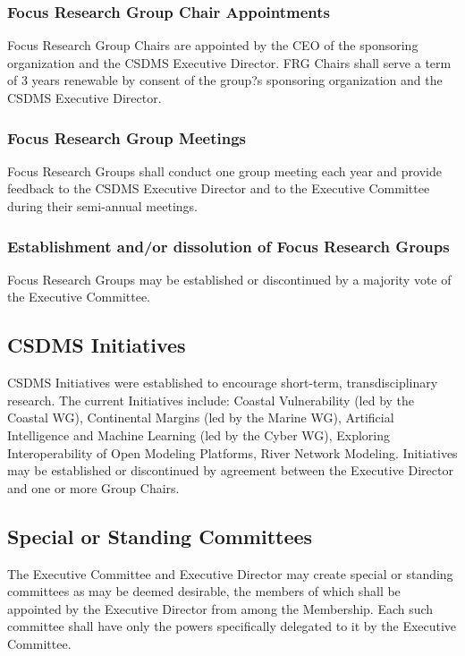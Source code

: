 \documentclass[11pt, oneside]{article}   	%
\begin{document}
\subsubsection{	Focus Research Group Chair Appointments}
Focus Research Group Chairs are appointed by the CEO of the sponsoring organization and the CSDMS Executive Director. FRG Chairs shall serve a term of 3 years renewable by consent of the group?s sponsoring organization and the CSDMS Executive Director.

\subsubsection{Focus Research Group Meetings}

Focus Research Groups shall conduct one group meeting each year and provide feedback to the CSDMS Executive Director and to the Executive Committee during their semi-annual meetings.
\subsubsection{	Establishment and/or dissolution of Focus Research Groups}

Focus Research Groups may be established or discontinued by a majority vote of the Executive Committee.  


\subsection{CSDMS Initiatives}

CSDMS Initiatives were established to encourage short-term, transdisciplinary research. The current Initiatives include: Coastal Vulnerability (led by the Coastal WG), Continental Margins (led by the Marine WG), Artificial Intelligence and Machine Learning (led by the Cyber WG), Exploring Interoperability of Open Modeling Platforms, River Network Modeling.  Initiatives may be established or discontinued by agreement between the Executive Director and one or more Group Chairs.


\subsection{Special or Standing Committees}

The Executive Committee and Executive Director may create special or standing committees as may be deemed desirable, the members of which shall be appointed by the Executive Director from among the Membership.  Each such committee shall have only the powers specifically delegated to it by the Executive Committee.
\end{document}
